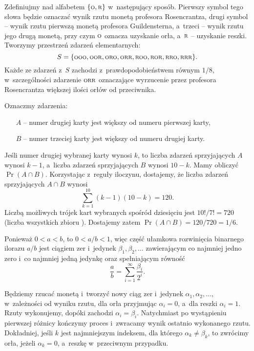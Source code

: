\exercise %
Zdefiniujmy  nad alfabetem $\{{\scriptstyle\rm O},{\scriptstyle\rm R}\}$ w~następujący sposób. Pierwszy symbol tego słowa będzie oznaczać wynik rzutu monetą profesora Rosencrantza, drugi symbol -- wynik rzutu pierwszą monetą profesora Guildensterna, a~trzeci -- wynik rzutu jego drugą monetą, przy czym $\scriptstyle\rm O$ oznacza uzyskanie orła, a~$\scriptstyle\rm R$ -- uzyskanie reszki. Tworzymy przestrzeń zdarzeń elementarnych:
\[
	S = \{{\scriptstyle\rm OOO},{\scriptstyle\rm OOR},{\scriptstyle\rm ORO},{\scriptstyle\rm ORR},{\scriptstyle\rm ROO},{\scriptstyle\rm ROR},{\scriptstyle\rm RRO},{\scriptstyle\rm RRR}\}.
\]
Każde ze zdarzeń z~$S$ zachodzi z~prawdopodobieństwem równym $1/8$, w~szczególności zdarzenie $\scriptstyle\rm ORR$ oznaczające wyrzucenie przez profesora Rosencrantza większej ilości orłów od przeciwnika.

\exercise %
Oznaczmy zdarzenia:
\begin{itemize}
	\item[$A$] -- numer drugiej karty jest większy od numeru pierwszej karty,
	\item[$B$] -- numer trzeciej karty jest większy od numeru drugiej karty.
\end{itemize}
Jeśli numer drugiej wybranej karty wynosi $k$, to liczba zdarzeń sprzyjających $A$ wynosi $k-1$, a~liczba zdarzeń sprzyjających $B$ wynosi $10-k$. Mamy obliczyć $\Pr(A\cap B)$. Korzystając z~reguły iloczynu, dostajemy, że liczba zdarzeń sprzyjających $A\cap B$ wynosi
\[
    \sum_{k=1}^{10}(k-1)(10-k) = 120.
\]
Liczbą możliwych trójek kart wybranych spośród dziesięciu jest $10!/7!=720$ (liczba wszystkich  zbioru ). Dostajemy zatem $\Pr(A\cap B)=120/720=1/6$.

\exercise %
Ponieważ $0<a<b$, to $0<a/b<1$, więc część ułamkowa rozwinięcia binarnego ilorazu $a/b$ jest ciągiem zer i~jedynek $\beta_1,\beta_2,\dots$ zawierającym co najmniej jedno zero i~co najmniej jedną jedynkę oraz spełniającym równość
\[
    \frac{a}{b} = \sum_{i=1}^\infty\frac{\beta_i}{2^i}.
\]

Będziemy rzucać monetą i~tworzyć nowy ciąg zer i~jedynek $\alpha_1,\alpha_2,\dots$, w~zależności od wyniku  rzutu, dla orła przyjmując $\alpha_i=0$, a~dla reszki $\alpha_i=1$. Rzuty wykonujemy, dopóki zachodzi $\alpha_i=\beta_i$. Natychmiast po wystąpieniu pierwszej różnicy kończymy proces i~zwracamy wynik ostatnio wykonanego rzutu. Dokładniej, jeśli $k$ jest najmniejszym indeksem, dla którego $\alpha_k\ne\beta_k$, to zwrócimy orła, jeżeli $\alpha_k=0$, a~reszkę w~przeciwnym przypadku.

